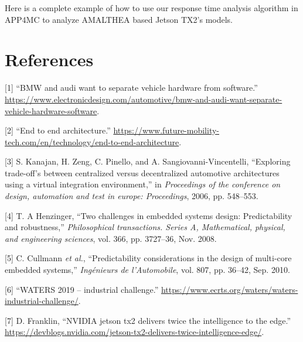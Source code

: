 \documentclass[
  12pt,
  a4paperpaper,
]{report}
\begin{document}
Here is a complete example of how to use our response time analysis
algorithm in APP4MC to analyze AMALTHEA based Jetson TX2's models.



\footnotesize

\hypertarget{references}{%
\chapter*{References}\label{references}}

\hypertarget{refs}{}
\leavevmode\hypertarget{ref-Hansen2019}{}%
{[}1{]} ``BMW and audi want to separate vehicle hardware from
software.''
\url{https://www.electronicdesign.com/automotive/bmw-and-audi-want-separate-vehicle-hardware-software}.

\leavevmode\hypertarget{ref-Future2019}{}%
{[}2{]} ``End to end architecture.''
\url{https://www.future-mobility-tech.com/en/technology/end-to-end-architecture}.

\leavevmode\hypertarget{ref-Kanajan2006}{}%
{[}3{]} S. Kanajan, H. Zeng, C. Pinello, and A. Sangiovanni-Vincentelli,
``Exploring trade-off's between centralized versus decentralized
automotive architectures using a virtual integration environment,'' in
\emph{Proceedings of the conference on design, automation and test in
europe: Proceedings}, 2006, pp. 548--553.

\leavevmode\hypertarget{ref-Henzinger2008}{}%
{[}4{]} T. A Henzinger, ``Two challenges in embedded systems design:
Predictability and robustness,'' \emph{Philosophical transactions.
Series A, Mathematical, physical, and engineering sciences}, vol. 366,
pp. 3727--36, Nov. 2008.

\leavevmode\hypertarget{ref-Cullmann2010}{}%
{[}5{]} C. Cullmann \emph{et al.}, ``Predictability considerations in
the design of multi-core embedded systems,'' \emph{Ingénieurs de
l'Automobile}, vol. 807, pp. 36--42, Sep. 2010.

\leavevmode\hypertarget{ref-Water2019Url}{}%
{[}6{]} ``WATERS 2019 -- industrial challenge.''
\url{https://www.ecrts.org/waters/waters-industrial-challenge/}.

\leavevmode\hypertarget{ref-TX2Intro2017}{}%
{[}7{]} D. Franklin, ``NVIDIA jetson tx2 delivers twice the intelligence
to the edge.''
\url{https://devblogs.nvidia.com/jetson-tx2-delivers-twice-intelligence-edge/}.
\end{document}
